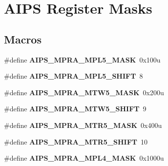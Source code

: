 \hypertarget{group__AIPS__Register__Masks}{}\section{A\+I\+PS Register Masks}
\label{group__AIPS__Register__Masks}
\subsection*{Macros}
\begin{DoxyCompactItemize}
\item 
\#define {\bfseries A\+I\+P\+S\+\_\+\+M\+P\+R\+A\+\_\+\+M\+P\+L5\+\_\+\+M\+A\+SK}~0x100u\hypertarget{group__AIPS__Register__Masks_ga71ed9c3c036fc2ff219b9df0ec430341}{}\label{group__AIPS__Register__Masks_ga71ed9c3c036fc2ff219b9df0ec430341}

\item 
\#define {\bfseries A\+I\+P\+S\+\_\+\+M\+P\+R\+A\+\_\+\+M\+P\+L5\+\_\+\+S\+H\+I\+FT}~8\hypertarget{group__AIPS__Register__Masks_ga210fb859f3b2f6a62697a9830f5b1af7}{}\label{group__AIPS__Register__Masks_ga210fb859f3b2f6a62697a9830f5b1af7}

\item 
\#define {\bfseries A\+I\+P\+S\+\_\+\+M\+P\+R\+A\+\_\+\+M\+T\+W5\+\_\+\+M\+A\+SK}~0x200u\hypertarget{group__AIPS__Register__Masks_gabd8948557054ceeee7b8284f0f41c72c}{}\label{group__AIPS__Register__Masks_gabd8948557054ceeee7b8284f0f41c72c}

\item 
\#define {\bfseries A\+I\+P\+S\+\_\+\+M\+P\+R\+A\+\_\+\+M\+T\+W5\+\_\+\+S\+H\+I\+FT}~9\hypertarget{group__AIPS__Register__Masks_gacbc18ce73a95d65e9e2534455f0c9f6d}{}\label{group__AIPS__Register__Masks_gacbc18ce73a95d65e9e2534455f0c9f6d}

\item 
\#define {\bfseries A\+I\+P\+S\+\_\+\+M\+P\+R\+A\+\_\+\+M\+T\+R5\+\_\+\+M\+A\+SK}~0x400u\hypertarget{group__AIPS__Register__Masks_gaee8e1d336f4a1b00f4277781a3f7cf12}{}\label{group__AIPS__Register__Masks_gaee8e1d336f4a1b00f4277781a3f7cf12}

\item 
\#define {\bfseries A\+I\+P\+S\+\_\+\+M\+P\+R\+A\+\_\+\+M\+T\+R5\+\_\+\+S\+H\+I\+FT}~10\hypertarget{group__AIPS__Register__Masks_ga92149f3159b90299cfe9b3f1c421273d}{}\label{group__AIPS__Register__Masks_ga92149f3159b90299cfe9b3f1c421273d}

\item 
\#define {\bfseries A\+I\+P\+S\+\_\+\+M\+P\+R\+A\+\_\+\+M\+P\+L4\+\_\+\+M\+A\+SK}~0x1000u\hypertarget{group__AIPS__Register__Masks_ga7055d1f141c29ac6764a7cd38aa83a30}{}\label{group__AIPS__Register__Masks_ga7055d1f141c29ac6764a7cd38aa83a30}


\end{DoxyCompactItemize}
